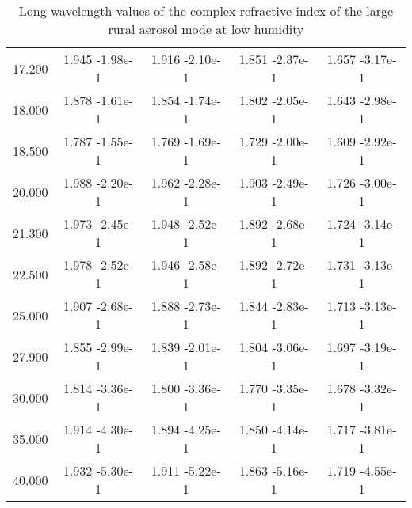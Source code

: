 \documentclass[12pt]{article}
\begin{document}
\begin{center}
\begin{table}
\begin{tabular}{| c | c | c | c | c |  }
17.200 &  1.945 -1.98e-1 &  1.916   -2.10e-1 &   1.851   -2.37e-1  &   1.657   -3.17e-1   \\
18.000 &  1.878 -1.61e-1 &  1.854   -1.74e-1 &   1.802   -2.05e-1  &   1.643   -2.98e-1     \\
18.500 & 1.787 -1.55e-1 &  1.769   -1.69e-1  &  1.729   -2.00e-1   &  1.609   -2.92e-1     \\
20.000 &  1.988 -2.20e-1 &  1.962   -2.28e-1 &   1.903   -2.49e-1  &   1.726   -3.00e-1     \\
21.300 &  1.973 -2.45e-1 &  1.948   -2.52e-1 &   1.892   -2.68e-1  &   1.724   -3.14e-1     \\
22.500 &  1.978 -2.52e-1 &  1.946   -2.58e-1 &   1.892   -2.72e-1  &   1.731   -3.13e-1     \\
25.000 &  1.907 -2.68e-1 &  1.888   -2.73e-1 &   1.844   -2.83e-1  &   1.713   -3.13e-1    \\
27.900 &  1.855 -2.99e-1 &  1.839   -2.01e-1 &   1.804   -3.06e-1  &   1.697   -3.19e-1    \\
30.000 &  1.814 -3.36e-1 &  1.800   -3.36e-1 &   1.770   -3.35e-1  &   1.678   -3.32e-1     \\
35.000 &  1.914 -4.30e-1 &  1.894   -4.25e-1 &   1.850   -4.14e-1  &   1.717   -3.81e-1     \\
40.000 &  1.932 -5.30e-1 &  1.911   -5.22e-1 &   1.863   -5.16e-1  &   1.719   -4.55e-1    \\
\hline
\end{tabular}
\caption{Long wavelength values of the complex refractive index of the large rural aerosol mode at low humidity}
\end{table}
\end{center}
\end{document}
